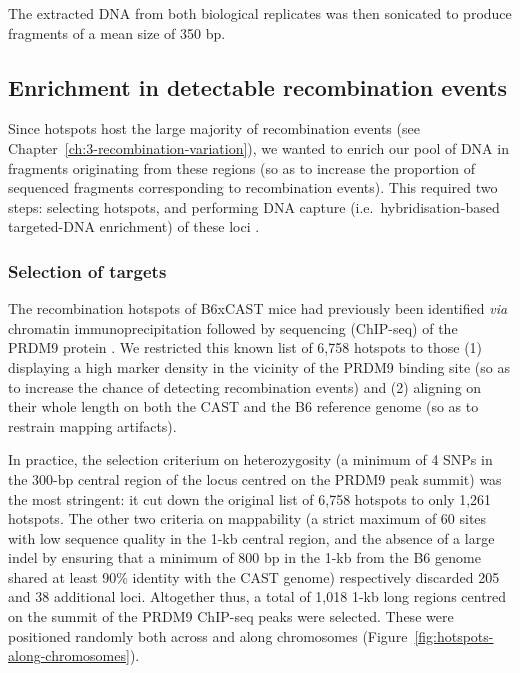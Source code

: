 The extracted DNA from both biological replicates was then sonicated to produce fragments of a mean size of 350 bp.


\subsection{Enrichment in detectable recombination events}%


Since hotspots host the large majority of recombination events (see Chapter~\ref{ch:3-recombination-variation}), we wanted to enrich our pool of DNA in fragments originating from these regions (so as to increase the proportion of sequenced fragments corresponding to recombination events).
This required two steps: selecting hotspots, and performing DNA capture (i.e.\ hybridisation-based targeted-DNA enrichment) of these loci \citep[reviewed in \citealp{horn2012target}]{gnirke2009solution,hodges2007genomewide}.

\subsubsection{Selection of targets}

The recombination hotspots of B6xCAST mice had previously been identified \textit{via} chromatin immunoprecipitation followed by sequencing (ChIP-seq) of the PRDM9 protein \citep{baker2015prdm9}.
We restricted this known list of 6,758 hotspots to those (1) displaying a high marker density in the vicinity of the PRDM9 binding site (so as to increase the chance of detecting recombination events) and (2) aligning on their whole length on both the CAST and the B6 reference genome (so as to restrain mapping artifacts).

In practice, the selection criterium on heterozygosity (a minimum of 4 SNPs in the 300-bp central region of the locus centred on the PRDM9 peak summit) was the most stringent: it cut down the original list of 6,758 hotspots to only 1,261 hotspots.
The other two criteria on mappability (a strict maximum of 60 sites with low sequence quality in the 1-kb central region, and the absence of a large indel by ensuring that a minimum of 800 bp in the 1-kb from the B6 genome shared at least 90\% identity with the CAST genome) respectively discarded 205 and 38 additional loci.
Altogether thus, a total of 1,018 1-kb long regions centred on the summit of the PRDM9 ChIP-seq peaks were selected.
These were positioned randomly both across and along chromosomes (Figure~\ref{fig:hotspots-along-chromosomes}).



